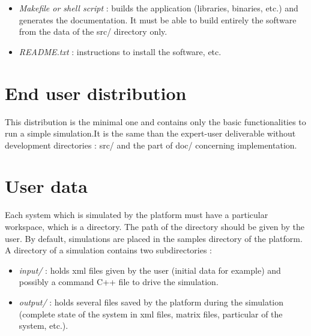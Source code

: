 \begin{itemize}
\item \textit{Makefile or shell script} : builds the application (libraries, binaries, etc.) and generates the documentation. It must be able to build entirely the software from the data of the src/ directory only.

\item \textit{README.txt} : instructions to install the software, etc.

\end{itemize}





\section{End user distribution}

This distribution is the minimal one and contains only the basic functionalities to run a simple simulation.It is the same than the expert-user deliverable without development directories : src/ and the part of doc/ concerning implementation.


\section{User data}
Each system which is simulated by the platform must have a particular workspace, which is a directory. The path of the directory should be given by the user. By default, simulations are placed in the samples directory of the platform. \\
A directory of a simulation contains two subdirectories :
\begin{itemize}
\item \textit{input/ }: holds \ac{xml} files given by the user (initial data for example) and possibly a command C++ file to drive the simulation.
\item \textit{output/ }: holds several files saved by the platform during the simulation (complete state of the system in \ac{xml} files, matrix files, particular of the system, etc.). 
\end{itemize}	



